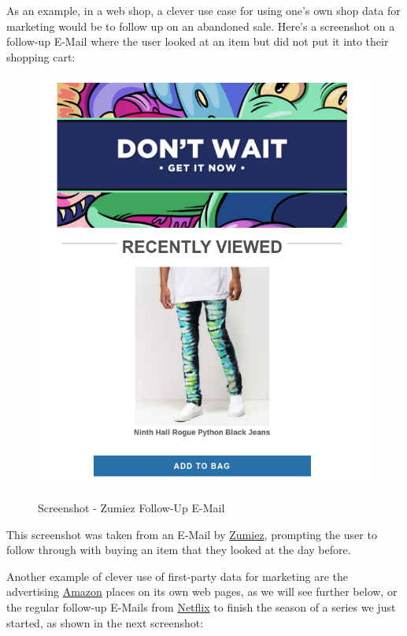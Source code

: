 As an example, in a web shop, a clever use case for using one's own shop data for marketing would be to follow up on an abandoned sale. Here's a screenshot on a follow-up E-Mail where the user looked at an item but did not put it into their shopping cart:

\begin{figure}[H]
\centering
\caption {Screenshot - Zumiez Follow-Up E-Mail}
\includegraphics[scale=0.6]{images/zumiez-dont-wait.png}
\label{fig:zumiez}
\end{figure}

This screenshot was taken from an E-Mail by \href{https://www.zumiez.com/}{Zumiez}, prompting the user to follow through with buying an item that they looked at the day before.

Another example of clever use of first-party data for marketing are the advertising \mbox{\href{https://smile.amazon.de/}{Amazon}} places on its own web pages, as we will see further below, or the regular follow-up E-Mails from \href{https://www.netflix.com/de-en/}{Netflix} to finish the season of a series we just started, as shown in the next screenshot:

